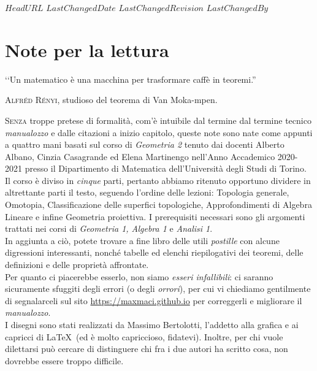 \svnidlong
{$HeadURL$}
{$LastChangedDate$}
{$LastChangedRevision$}
{$LastChangedBy$}

\chapter*{Note per la lettura}

\begin{introduction}
‘‘Un matematico è una macchina per trasformare caffè in teoremi.''
\begin{flushright}
	\textsc{Alfréd Rényi,} studioso del teorema di Van Moka-mpen.
\end{flushright}
\end{introduction}

\lettrine[findent=1pt, nindent=0pt]{S}{enza} troppe pretese di formalità, com'è intuibile dal termine dal termine tecnico \textit{manualozzo} e dalle citazioni a inizio capitolo, queste note sono nate come appunti a quattro mani basati sul corso di \textit{Geometria 2} tenuto dai docenti Alberto Albano, Cinzia Casagrande ed Elena Martinengo nell'Anno Accademico 2020-2021 presso il Dipartimento di Matematica dell'Università degli Studi di Torino.\\
Il corso è diviso in \textit{cinque} parti, pertanto abbiamo ritenuto opportuno dividere in altrettante parti il testo, seguendo l'ordine delle lezioni: Topologia generale, Omotopia, Classificazione delle superfici topologiche, Approfondimenti di Algebra Lineare e infine Geometria proiettiva. I prerequisiti necessari sono gli argomenti trattati nei corsi di \textit{Geometria 1, Algebra 1} e \textit{Analisi 1}.\\
In aggiunta a ciò, potete trovare a fine libro delle utili \textit{postille} con alcune digressioni interessanti, nonché tabelle ed elenchi riepilogativi dei teoremi, delle definizioni e delle proprietà affrontate.\\
Per quanto ci piacerebbe esserlo, non siamo \textit{esseri infallibili}: ci saranno sicuramente sfuggiti degli errori (o degli \textit{orrori}), per cui vi chiediamo gentilmente di segnalarceli sul sito \textcolor{redill}{\url{https://maxmaci.github.io}} per correggerli e migliorare il \textit{manualozzo}.\\
I disegni sono stati realizzati da Massimo Bertolotti, l'addetto alla grafica e ai capricci di \LaTeX\ (ed è molto capriccioso, fidatevi). Inoltre, per chi vuole dilettarsi può cercare di distinguere chi fra i due autori ha scritto cosa, non dovrebbe essere troppo difficile.